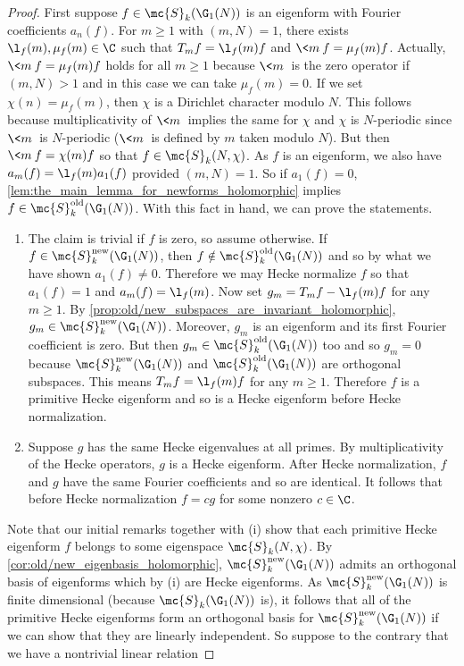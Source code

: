     \begin{proof}
      First suppose $f \in \mc{S}_{k}(\G_{1}(N))$ is an eigenform with Fourier coefficients $a_{n}(f)$. For $m \ge 1$ with $(m,N) = 1$, there exists $\l_{f}(m),\mu_{f}(m) \in \C$ such that $T_{m}f = \l_{f}(m)f$ and $\<m\>f = \mu_{f}(m)f$. Actually, $\<m\>f = \mu_{f}(m)f$ holds for all $m \ge 1$ because $\<m\>$ is the zero operator if $(m,N) > 1$ and in this case we can take $\mu_{f}(m) = 0$. If we set $\chi(n) = \mu_{f}(m)$, then $\chi$ is a Dirichlet character modulo $N$. This follows because multiplicativity of $\<m\>$ implies the same for $\chi$ and $\chi$ is $N$-periodic since $\<m\>$ is $N$-periodic ($\<m\>$ is defined by $m$ taken modulo $N$). But then $\<m\>f = \chi(m)f$ so that $f \in \mc{S}_{k}(N,\chi)$. As $f$ is an eigenform, we also have $a_{m}(f) = \l_{f}(m)a_{1}(f)$ provided $(m,N) = 1$. So if $a_{1}(f) = 0$, \cref{lem:the_main_lemma_for_newforms_holomorphic} implies $f \in \mc{S}_{k}^{\mathrm{old}}(\G_{1}(N))$. With this fact in hand, we can prove the statements.
      \begin{enumerate}[label=(\roman*)]
        \item The claim is trivial if $f$ is zero, so assume otherwise. If $f \in \mc{S}_{k}^{\mathrm{new}}(\G_{1}(N))$, then $f \notin \mc{S}_{k}^{\mathrm{old}}(\G_{1}(N))$ and so by what we have shown $a_{1}(f) \neq 0$. Therefore we may Hecke normalize $f$ so that $a_{1}(f) = 1$ and $a_{m}(f) = \l_{f}(m)$. Now set $g_{m} = T_{m}f-\l_{f}(m)f$ for any $m \ge 1$. By \cref{prop:old/new_subspaces_are_invariant_holomorphic}, $g_{m} \in \mc{S}_{k}^{\mathrm{new}}(\G_{1}(N))$. Moreover, $g_{m}$ is an eigenform and its first Fourier coefficient is zero. But then $g_{m} \in \mc{S}_{k}^{\mathrm{old}}(\G_{1}(N))$ too and so $g_{m} = 0$ because $\mc{S}_{k}^{\mathrm{new}}(\G_{1}(N))$ and $\mc{S}_{k}^{\mathrm{old}}(\G_{1}(N))$ are orthogonal subspaces. This means $T_{m}f = \l_{f}(m)f$ for any $m \ge 1$. Therefore $f$ is a primitive Hecke eigenform and so is a Hecke eigenform before Hecke normalization.
        \item Suppose $g$ has the same Hecke eigenvalues at all primes. By multiplicativity of the Hecke operators, $g$ is a Hecke eigenform. After Hecke normalization, $f$ and $g$ have the same Fourier coefficients and so are identical. It follows that before Hecke normalization $f = cg$ for some nonzero $c \in \C$.
      \end{enumerate}
      Note that our initial remarks together with (i) show that each primitive Hecke eigenform $f$ belongs to some eigenspace $\mc{S}_{k}(N,\chi)$. By \cref{cor:old/new_eigenbasis_holomorphic}, $\mc{S}_{k}^{\mathrm{new}}(\G_{1}(N))$ admits an orthogonal basis of eigenforms which by (i) are Hecke eigenforms. As $\mc{S}_{k}^{\mathrm{new}}(\G_{1}(N))$ is finite dimensional (because $\mc{S}_{k}(\G_{1}(N))$ is), it follows that all of the primitive Hecke eigenforms form an orthogonal basis for $\mc{S}_{k}^{\mathrm{new}}(\G_{1}(N))$ if we can show that they are linearly independent. So suppose to the contrary that we have a nontrivial linear relation

\end{proof}
